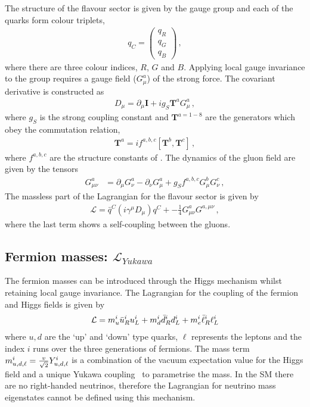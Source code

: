 The structure of the flavour sector is given by the \grpsuthree gauge group and each of the quarks form colour triplets, 
\begin{align}
q_C = \begin{pmatrix}q_R\\q_G\\q_B\end{pmatrix} \, ,
\end{align}
where there are three colour indices, $R$, $G$ and $B$.
Applying local gauge invariance to the \grpsuthree group 
requires a gauge field ($G_\mu^{a}$) of the strong force. 
The covariant derivative is constructed as
\begin{align}
D_\mu = \partial_\mu \mathbf{I} + i g_S \mathbf{T}^a G^{a}_\mu \, ,
\end{align}
where $g_S$ is the strong coupling constant and $\mathbf{T}^{a=1-8}$ are the 
\grpsuthree generators which obey the commutation relation,
\begin{align}
\mathbf{T}^a = i f^{a,b,c} \left[ \mathbf{T}^b, \mathbf{T}^c  \right] \, ,
\end{align}
where $f^{a,b,c}$ are the structure constants of \grpsuthree.
The dynamics of the gluon field are given by the tensors
\begin{align}
G^a_{\mu\nu} &= \partial_\mu G^a_{\nu}  - \partial_\nu G^a_{\mu}  + g_S f^{a,b,c} G^b_{\mu}  G^c_{\nu}   \, ,
\end{align}
The massless part of the Lagrangian for the flavour sector is given by
\begin{align}
\mathcal{L} =  \bar{q}^C \left( i \gamma^\mu D_\mu \right) q^C +  - \frac{1}{4} G^a_{\mu\nu} G^{a,\mu\nu} \, ,
\end{align}
where the last term shows a self-coupling between the gluons.

\subsection{ Fermion masses: $\mathcal{L}_{Yukawa}$	}
\label{sec:yukawa}
The fermion masses can be introduced through the Higgs mechanism whilst retaining local gauge invariance.
The Lagrangian for the coupling of the fermion and Higgs fields is given by 
\begin{align}
\mathcal{L} =   m_u^i \bar{u}^i_R u^i_L + m_d^i \bar{d}^i_R d^i_L + m_e^i \bar{\ell}^i_R \ell^i_L
\end{align}
where $u,d$ are the `up' and `down' type quarks, $\ell$ represents the leptons and 
the index $i$ runs over the three generations of fermions.
The mass term $m_{u,d,\ell}^i = \frac{v}{\sqrt{2}} Y_{u,d,\ell}^i$ is a combination of 
the vacuum expectation value for the Higgs field and a unique Yukawa coupling~\cite{Yukawa:1935xg} to parametrise the mass.
In the SM there are no right-handed neutrinos, therefore the Lagrangian for neutrino mass eigenstates cannot be defined using this mechanism.

